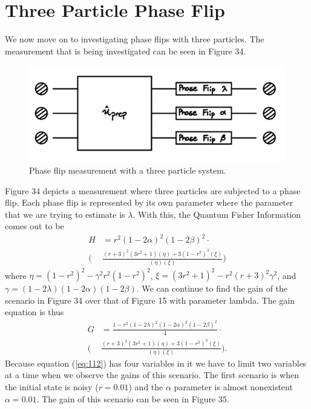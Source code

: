 \documentclass[twocolumn]{article}
\begin{document}
\section*{Three Particle Phase Flip}
We now move on to investigating phase flips with three particles. The measurement that is being investigated can be seen in Figure 34.
\begin{figure}[h]
\begin{center}
\includegraphics[width=0.65\linewidth]{Phase-Flip-Triple-Channel-Lambda-Schematic.jpg}
\caption{Phase flip measurement with a three particle system.}
\end{center}
\end{figure}
\newline
Figure 34 depicts a measurement where three particles are subjected to a phase flip. Each phase flip is represented by its own parameter where the parameter that we are trying to estimate is $\lambda$. With this, the Quantum Fisher Information comes out to be
\begin{align}\label{eq:111}
H&=r^2(1-2\alpha)^2(1-2\beta)^2\cdot \nonumber \\
\bigg(&\frac{(r+3)^2(3r^2+1)(\eta)+3(1-r^2)^3(\xi)}{(\eta)(\xi)}\bigg)
\end{align}
where $\eta=(1-r^2)^2-\gamma^2r^2(1-r^2)^2$, $\xi=(3r^2+1)^2-r^2(r+3)^2\gamma^2$, and $\gamma=(1-2\lambda)(1-2\alpha)(1-2\beta)$. We can continue to find the gain of the scenario in Figure 34 over that of Figure 15 with parameter lambda. The gain equation is thus
\begin{align}\label{eq:112}
G&=\frac{1-r^2(1-2\lambda)^2(1-2\alpha)^2(1-2\beta)^2}{4}\cdot \nonumber \\
\bigg(&\frac{(r+3)^2(3r^2+1)(\eta)+3(1-r^2)^3(\xi)}{(\eta)(\xi)}\bigg).
\end{align}
Because equation (\ref{eq:112}) has four variables in it we have to limit two variables at a time when we observe the gains of this scenario. The first scenario is when the initial state is noisy ($r=0.01$) and the $\alpha$ parameter is almost nonexistent $\alpha=0.01$. The gain of this scenario can be seen in Figure 35.
\end{document}
